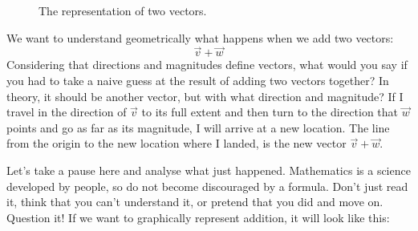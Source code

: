 \documentclass[a4,12pt,twosided,openany]{memoir}
\begin{document}
\begin{figure}[h!]
\begin{center}
\end{center}
\caption{The representation of two vectors.}\label{fig:twoVectorsRepresentation}
\end{figure}
\par 
\indent
We want to understand geometrically what happens when we add two vectors:
\[\overrightarrow{v} + \overrightarrow{w}\]
Considering that directions and magnitudes define vectors, what would you say if you had to take a naive guess at the result of adding two vectors together? In theory, it should be another vector, but with what direction and magnitude? If I travel in the direction of $\overrightarrow{v}$ to its full extent and then turn to the direction that $\overrightarrow{w}$ points and go as far as its magnitude, I will arrive at a new location. The line from the origin to the new location where I landed, is the new vector $\overrightarrow{v} + \overrightarrow{w}$.
\par 
\indent
Let’s take a pause here and analyse what just happened. Mathematics is a science developed by people, so do not become discouraged by a formula. Don’t just read it, think that you can’t understand it, or pretend that you did and move on. Question it! If we want to graphically represent addition, it will look like this:
\end{document}
